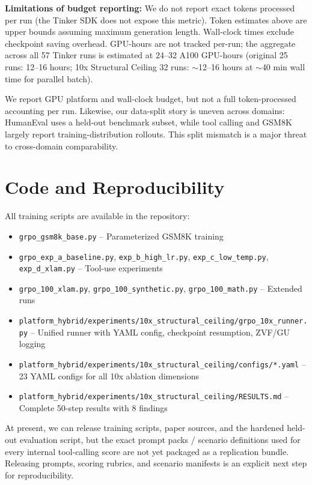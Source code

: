 \documentclass{article}
\begin{document}
\textbf{Limitations of budget reporting:} We do not report exact tokens processed per run (the Tinker SDK does not expose this metric). Token estimates above are upper bounds assuming maximum generation length. Wall-clock times exclude checkpoint saving overhead. GPU-hours are not tracked per-run; the aggregate across all 57 Tinker runs is estimated at 24--32 A100 GPU-hours (original 25 runs: 12--16 hours; 10x Structural Ceiling 32 runs: $\sim$12--16 hours at $\sim$40 min wall time for parallel batch).

We report GPU platform and wall-clock budget, but not a full token-processed accounting per run. Likewise, our data-split story is uneven across domains: HumanEval uses a held-out benchmark subset, while tool calling and GSM8K largely report training-distribution rollouts. This split mismatch is a major threat to cross-domain comparability.

\section{Code and Reproducibility}

All training scripts are available in the repository:
\begin{itemize}
    \item \texttt{grpo\_gsm8k\_base.py} -- Parameterized GSM8K training
    \item \texttt{grpo\_exp\_a\_baseline.py}, \texttt{exp\_b\_high\_lr.py}, \texttt{exp\_c\_low\_temp.py}, \texttt{exp\_d\_xlam.py} -- Tool-use experiments
    \item \texttt{grpo\_100\_xlam.py}, \texttt{grpo\_100\_synthetic.py}, \texttt{grpo\_100\_math.py} -- Extended runs
    \item \texttt{platform\_hybrid/experiments/10x\_structural\_ceiling/grpo\_10x\_runner.py} -- Unified runner with YAML config, checkpoint resumption, ZVF/GU logging
    \item \texttt{platform\_hybrid/experiments/10x\_structural\_ceiling/configs/*.yaml} -- 23 YAML configs for all 10x ablation dimensions
    \item \texttt{platform\_hybrid/experiments/10x\_structural\_ceiling/RESULTS.md} -- Complete 50-step results with 8 findings
\end{itemize}

At present, we can release training scripts, paper sources, and the hardened held-out evaluation script, but the exact prompt packs / scenario definitions used for every internal tool-calling score are not yet packaged as a replication bundle. Releasing prompts, scoring rubrics, and scenario manifests is an explicit next step for reproducibility.
\end{document}
